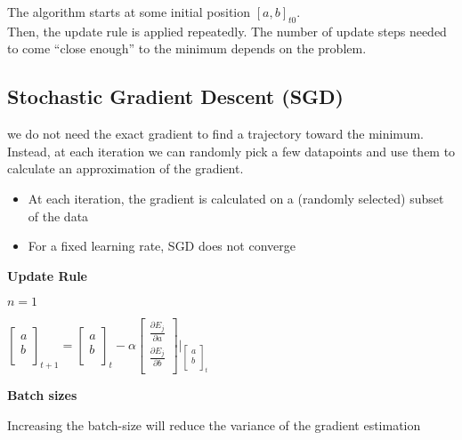 The algorithm starts at some initial position $[a, b]_{t0}$. \\
Then, the update rule is applied repeatedly.
The number of update steps needed to come ``close enough'' to the minimum depends on the problem.

\subsection{Stochastic Gradient Descent (SGD)}
we do not need the exact gradient to find a trajectory toward the minimum. Instead, at each iteration we can randomly pick a few datapoints and use them to calculate an approximation of the gradient. \\

\begin{itemize}
    \item At each iteration, the gradient is calculated on a (randomly selected) subset of the data
    \item For a fixed learning rate, SGD does not converge
\end{itemize}
\vspace{10pt}
\textbf{Update Rule}

$n = 1$
\begin{center}
    $
    \begin{bmatrix}
        a \\
        b \\
    \end{bmatrix}_{t+1}
    =    \begin{bmatrix}
             a \\
             b \\
    \end{bmatrix}_{t} - \alpha
    \begin{bmatrix}
        \frac{\partial E_j}{\partial a} \\
        \frac{\partial E_j}{\partial b} \\
    \end{bmatrix} \Big\rvert _{\begin{bmatrix}
                                   a \\
                                   b \\
    \end{bmatrix}_{t} }
    $
\end{center}
\vspace{10pt}

\textbf{Batch sizes}

Increasing the batch-size will reduce the variance of the gradient estimation

